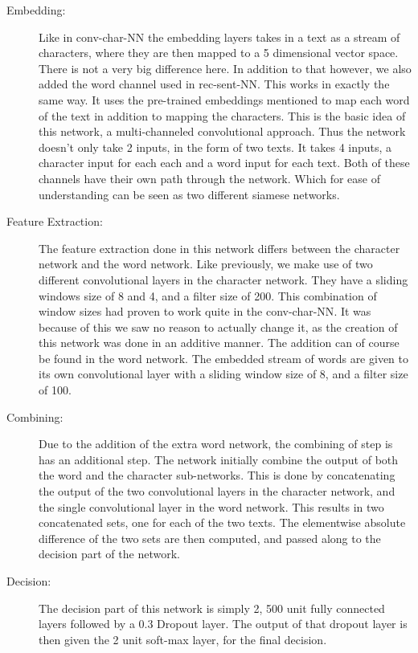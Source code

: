 \begin{description}

    \item[Embedding:]

    Like in \gls{conv-char-NN} the embedding layers takes in a text as a
    stream of characters, where they are then mapped to a 5 dimensional vector
    space. There is not a very big difference here. In addition to that however,
    we also added the word channel used in \gls{rec-sent-NN}. This works in
    exactly the same way. It uses the pre-trained embeddings mentioned to map
    each word of the text in addition to mapping the characters. This is the
    basic idea of this network, a multi-channeled convolutional approach. Thus
    the network doesn't only take 2 inputs, in the form of two texts. It takes 4
    inputs, a character input for each each and a word input for each text. Both
    of these channels have their own path through the network. Which for ease of
    understanding can be seen as two different siamese networks.

    \item[Feature Extraction:]

    The feature extraction done in this network differs between the character
    network and the word network. Like previously, we make use of two different
    convolutional layers in the character network. They have a sliding windows
    size of 8 and 4, and a filter size of 200. This combination of window sizes
    had proven to work quite in the \gls{conv-char-NN}. It was because of this
    we saw no reason to actually change it, as the creation of this network was
    done in an additive manner. The addition can of course be found in the word
    network. The embedded stream of words are given to its own convolutional
    layer with a sliding window size of 8, and a filter size of 100.

    \item[Combining:]

    Due to the addition of the extra word network, the combining of step is
    has an additional step. The network initially combine the output of both
    the word and the character sub-networks. This is done by concatenating
    the output of the two convolutional layers in the character network, and
    the single convolutional layer in the word network. This results in two
    concatenated sets, one for each of the two texts. The elementwise absolute
    difference of the two sets are then computed, and passed along to the
    decision part of the network.

    \item[Decision:]

    The decision part of this network is simply 2, 500 unit fully connected
    layers followed by a 0.3 Dropout layer. The output of that dropout layer
    is then given the 2 unit soft-max layer, for the final decision.

\end{description}


